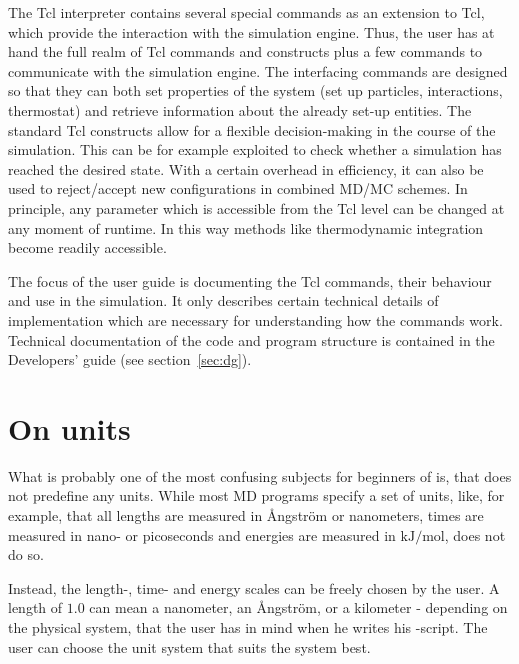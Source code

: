 The Tcl interpreter contains several special commands as an
extension to Tcl, which provide the interaction with the
simulation engine. Thus, the user has at hand the full realm
of Tcl commands and constructs plus a few commands to communicate
with the simulation engine. The interfacing commands are designed
so that they can both set properties of the system (set up particles,
interactions, thermostat) and retrieve information about the already 
set-up entities. The standard Tcl constructs allow for a flexible 
decision-making in the course of the simulation. This can be for example
exploited to check whether a simulation has reached the desired state.
With a certain overhead in efficiency, it can also be used to reject/accept
new configurations in combined MD/MC schemes. In principle, any parameter
which is accessible from the Tcl level can be changed at any moment of runtime.
In this way methods like thermodynamic integration become readily accessible.

The focus of the user guide is documenting the Tcl commands, their behaviour
and use in the simulation. It only describes certain technical details 
of implementation which are necessary for understanding how the commands work.
Technical documentation of the code and program structure is contained in the 
Developers' guide (see section~\ref{sec:dg}).


\section{On units}
\label{sec:units}

What is probably one of the most confusing subjects for beginners of
\es is, that \es does not predefine any units.  While most MD programs
specify a set of units, like, for example, that all lengths are
measured in \AA ngstr\"om or nanometers, times are measured in nano- or
picoseconds and energies are measured in $\mathrm{kJ/mol}$,
\es does not do so.

Instead, the length-, time- and energy scales can be freely chosen by
the user.  A length of $1.0$ can mean a nanometer, an \AA ngstr\"om,
or a kilometer - depending on the physical system, that the user has
in mind when he writes his \es-script.  The user can choose the unit
system that suits the system best.

